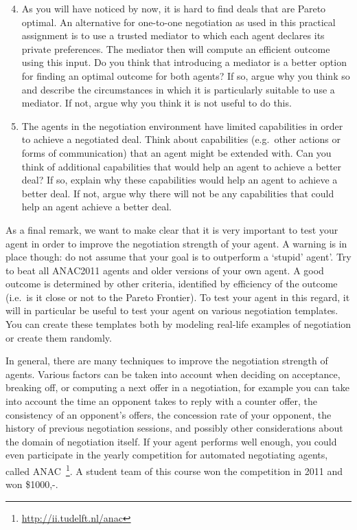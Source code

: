 \documentclass[a4paper]{article}
\begin{document}
\begin{enumerate}
\setcounter{enumi}{3}
  \item As you will have noticed by now, it is hard to find deals that are Pareto optimal. An alternative for one-to-one negotiation as used in this practical assignment is to use a trusted mediator to which each agent declares its private preferences. The mediator then will compute an efficient outcome using this input. Do you think that introducing a mediator is a better option for finding an optimal outcome for both agents? If so, argue why you think so and describe the circumstances in which it is particularly suitable to use a mediator. If not, argue why you think it is not useful to do this.
  \item The agents in the negotiation environment have limited capabilities in order to achieve a negotiated deal. Think about capabilities (e.g.\ other actions or forms of communication) that an agent might be extended with. Can you think of additional capabilities that would help an agent to achieve a better deal? If so, explain why these capabilities would help an agent to achieve a better deal. If not, argue why there will not be any capabilities that could help an agent achieve a better deal.
\end{enumerate}

As a final remark, we want to make clear that it is very important to test your agent in order to improve the negotiation strength of your agent. A warning is in place though: do not assume that your goal is to outperform a `stupid' agent'. Try to beat all ANAC2011 agents and older versions of your own agent. A good outcome is determined by other criteria, identified by efficiency of the outcome (i.e.\ is it close or not to the Pareto Frontier). To test your agent in this regard, it will in particular be useful to test your agent on various negotiation templates. You can create these templates both by modeling real-life examples of negotiation or create them randomly. 

In general, there are many techniques to improve the negotiation strength of agents. Various factors can be taken into account when deciding on acceptance, breaking off, or computing a next offer in a negotiation, for example you can take into account the time an opponent takes to reply with a counter offer, the consistency of an opponent's offers, the concession rate of your opponent, the history of previous negotiation sessions, and possibly other considerations about the domain of negotiation itself. If your agent performs well enough, you could even participate in the yearly competition for automated negotiating agents, called ANAC~\cite{Baarslag10ANAC}\footnote{\url{http://ii.tudelft.nl/anac}}. A student team of this course won the competition in 2011 and won \$1000,-.
 
\end{document}
